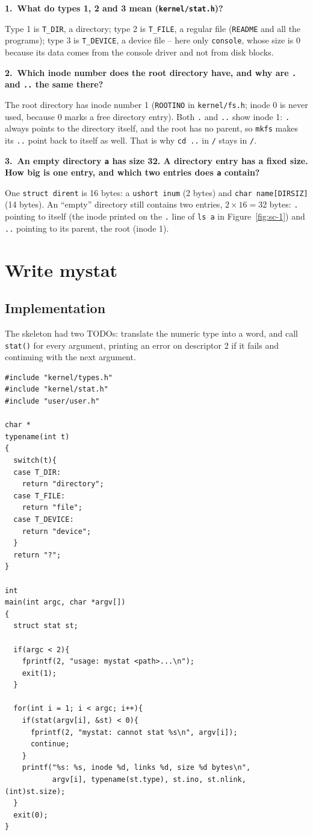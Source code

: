\documentclass[12pt,a4paper]{article}
\newcommand{\qa}[2]{%
  \par\needspace{5\baselineskip}\medskip
  \noindent\textbf{#1.~#2}\par\smallskip\noindent}
\begin{document}
\qa{1}{What do types 1, 2 and 3 mean (\texttt{kernel/stat.h})?}
Type 1 is \texttt{T\_DIR}, a directory; type 2 is \texttt{T\_FILE}, a regular file (\texttt{README} and all the programs); type 3 is \texttt{T\_DEVICE}, a device file -- here only \texttt{console}, whose size is 0 because its data comes from the console driver and not from disk blocks.

\qa{2}{Which inode number does the root directory have, and why are \texttt{.} and \texttt{..} the same there?}
The root directory has inode number 1 (\texttt{ROOTINO} in \texttt{kernel/fs.h}; inode 0 is never used, because 0 marks a free directory entry). Both \texttt{.} and \texttt{..} show inode 1: \texttt{.} always points to the directory itself, and the root has no parent, so \texttt{mkfs} makes its \texttt{..} point back to itself as well. That is why \texttt{cd ..} in \texttt{/} stays in \texttt{/}.

\qa{3}{An empty directory \texttt{a} has size 32. A directory entry has a fixed size. How big is one entry, and which two entries does \texttt{a} contain?}
One \texttt{struct dirent} is 16 bytes: a \texttt{ushort inum} (2 bytes) and \texttt{char name[DIRSIZ]} (14 bytes). An ``empty'' directory still contains two entries, $2 \times 16 = 32$ bytes: \texttt{.} pointing to itself (the inode printed on the \texttt{.} line of \texttt{ls a} in Figure~\ref{fig:sc-1}) and \texttt{..} pointing to its parent, the root (inode 1).

\newpage
\section{Write mystat}

\subsection{Implementation}

The skeleton had two TODOs: translate the numeric type into a word, and call \texttt{stat()} for every argument, printing an error on descriptor 2 if it fails and continuing with the next argument.

\begin{lstlisting}[style=code,caption={user/mystat.c}]
#include "kernel/types.h"
#include "kernel/stat.h"
#include "user/user.h"

char *
typename(int t)
{
  switch(t){
  case T_DIR:
    return "directory";
  case T_FILE:
    return "file";
  case T_DEVICE:
    return "device";
  }
  return "?";
}

int
main(int argc, char *argv[])
{
  struct stat st;

  if(argc < 2){
    fprintf(2, "usage: mystat <path>...\n");
    exit(1);
  }

  for(int i = 1; i < argc; i++){
    if(stat(argv[i], &st) < 0){
      fprintf(2, "mystat: cannot stat %s\n", argv[i]);
      continue;
    }
    printf("%s: %s, inode %d, links %d, size %d bytes\n",
           argv[i], typename(st.type), st.ino, st.nlink, (int)st.size);
  }
  exit(0);
}
\end{lstlisting}
\end{document}
